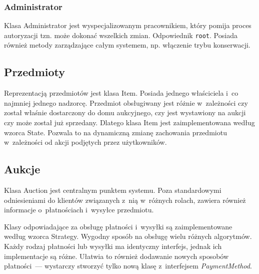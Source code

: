 \documentclass[10pt,a4paper]{article}
\newcommand{\f}[1]{\texttt{#1}}
\newcommand{\s}[1]{\textsf{#1}}
\begin{document}
\subsubsection{Administrator}

Klasa \s{Administrator} jest wyspecjalizowanym pracownikiem, który pomija
proces autoryzacji tzn. może dokonać wszelkich zmian. Odpowiednik \f{root}.
Posiada również metody zarządzające całym systemem, np. włączenie trybu
konserwacji.

\subsection{Przedmioty}

Reprezentacją przedmiotów jest klasa \s{Item}. Posiada jednego właściciela i~co
najmniej jednego nadzorcę. Przedmiot obsługiwany jest różnie w~zależności czy
został właśnie dostarczony do domu aukcyjnego, czy jest wystawiony na aukcji
czy może został już sprzedany. Dlatego klasa \s{Item} jest zaimplementowana
według wzorca \s{State}. Pozwala to na dynamiczną zmianę zachowania przedmiotu
w~zależności od akcji podjętych przez użytkowników.

\subsection{Aukcje}

Klasa \s{Auction} jest centralnym punktem systemu. Poza standardowymi
odniesieniami do klientów związanych z~nią w~różnych rolach, zawiera również
informacje o~płatnościach i~wysyłce przedmiotu.

Klasy odpowiadające za obsługę płatności i~wysyłki są zaimplementowane według
wzorca \s{Strategy}. Wygodny sposób na obsługę wielu różnych algorytmów. Każdy
rodzaj płatności lub wysyłki ma identyczny interfejs, jednak ich implementacje
są różne. Ułatwia to również dodawanie nowych sposobów płatności~--- wystarczy
stworzyć tylko nową klasę z~interfejsem \textit{\s{PaymentMethod}}.
\end{document}
